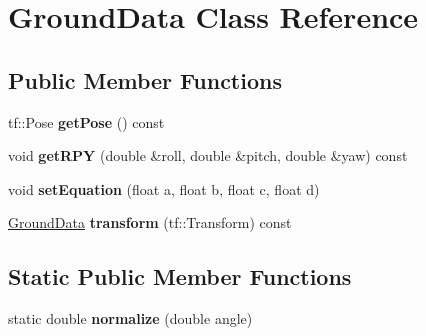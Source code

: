 \hypertarget{classGroundData}{\section{\-Ground\-Data \-Class \-Reference}
\label{classGroundData}
}
\subsection*{\-Public \-Member \-Functions}
\begin{DoxyCompactItemize}
\item 
\hypertarget{classGroundData_aa29b6ae9004fb510f3a1262337fa3bad}{tf\-::\-Pose {\bfseries get\-Pose} () const }\label{classGroundData_aa29b6ae9004fb510f3a1262337fa3bad}

\item 
\hypertarget{classGroundData_af31ca9c984769df196ca32332d960f1e}{void {\bfseries get\-R\-P\-Y} (double \&roll, double \&pitch, double \&yaw) const }\label{classGroundData_af31ca9c984769df196ca32332d960f1e}

\item 
\hypertarget{classGroundData_ae25ff85d1fa8f88ec8e8a7e5bf1774da}{void {\bfseries set\-Equation} (float a, float b, float c, float d)}\label{classGroundData_ae25ff85d1fa8f88ec8e8a7e5bf1774da}

\item 
\hypertarget{classGroundData_a4299c07208ef50609639f0c9bd8d1a8a}{\hyperlink{classGroundData}{\-Ground\-Data} {\bfseries transform} (tf\-::\-Transform) const }\label{classGroundData_a4299c07208ef50609639f0c9bd8d1a8a}

\end{DoxyCompactItemize}
\subsection*{\-Static \-Public \-Member \-Functions}
\begin{DoxyCompactItemize}
\item 
\hypertarget{classGroundData_a9964261c8d5cfd05c7ae7a18150f9c00}{static double {\bfseries normalize} (double angle)}\label{classGroundData_a9964261c8d5cfd05c7ae7a18150f9c00}

\end{DoxyCompactItemize}
